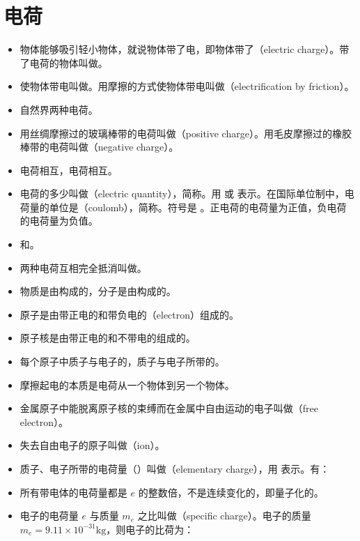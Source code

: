 \section{电荷}

\vspace{10pt}
\begin{itemize}
\item 物体能够吸引轻小物体，就说物体带了电，即物体带了（electric charge）。带了电荷的物体叫做。
\item 使物体带电叫做。用摩擦的方式使物体带电叫做（electrification by friction）。
\item 自然界两种电荷。
\item 用丝绸摩擦过的玻璃棒带的电荷叫做（positive charge）。用毛皮摩擦过的橡胶棒带的电荷叫做（negative charge）。
\item {}电荷相互，电荷相互。
\item 电荷的多少叫做（electric quantity），简称。用  或  表示。在国际单位制中，电荷量的单位是（coulomb），简称。符号是 。正电荷的电荷量为正值，负电荷的电荷量为负值。
\item {}和。
\item 两种电荷互相完全抵消叫做。
\item 物质是由构成的，分子是由构成的。
\item 原子是由带正电的和带负电的（electron）组成的。
\item 原子核是由带正电的和不带电的组成的。
\item 每个原子中质子与电子的，质子与电子所带的。
\item 摩擦起电的本质是电荷从一个物体到另一个物体。
\item 金属原子中能脱离原子核的束缚而在金属中自由运动的电子叫做（free electron）。
\item 失去自由电子的原子叫做（ion）。
\item 质子、电子所带的电荷量（）叫做（elementary charge），用  表示。有：
\item 所有带电体的电荷量都是 $e$ 的整数倍，不是连续变化的，即量子化的。
\item 电子的电荷量 $e$ 与质量 $m_e$ 之比叫做（specific charge）。电子的质量 $m_e=9.11\times10^{-31}\text{kg}$，则电子的比荷为：

\end{itemize}
